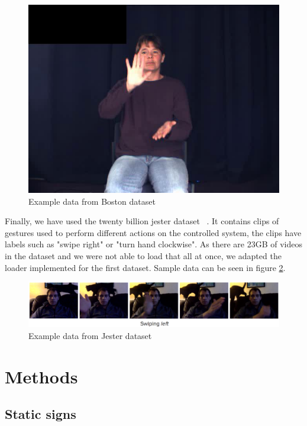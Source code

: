 \documentclass[10pt,twocolumn,letterpaper]{article}
\begin{document}
\begin{figure}
	\includegraphics[width=\linewidth]{boston_dataset_gesture.jpg}
	\caption{Example data from Boston dataset}
	\label{fig:boston_image}
\end{figure}


Finally, we have used the twenty billion jester dataset ~\cite{Jester_dynamic}.
It contains clips of gestures used to perform different actions on the controlled system,
the clips have labels such as "swipe right" or "turn hand clockwise".
As there are 23GB of videos in the dataset and we were not able to load that all at once, we adapted the loader implemented for the first dataset.
Sample data can be seen in figure \ref{fig:jester_1}.

\begin{figure}
	\includegraphics[width=\linewidth]{jester.png}
	\caption{Example data from Jester dataset}
	\label{fig:jester_1}
\end{figure}

\section{Methods}

\subsection{Static signs}
\end{document}

